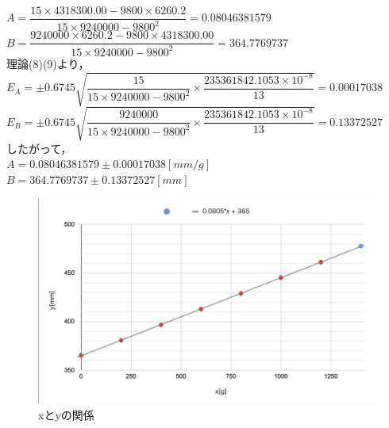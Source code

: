 \documentclass[a4paper,1pt]{jsarticle}
\begin{document}
$A=\dfrac{15\times4318300.00-9800\times6260.2}{15\times9240000-9800^2}=0.08046381579$\\

$B=\dfrac{9240000\times6260.2-9800\times4318300.00}{15\times9240000-9800^2}=364.7769737$\\

理論(8)(9)より，\\

$E_A=\pm0.6745\sqrt{\dfrac{15}{15\times9240000-9800^2}\times\dfrac{235361842.1053\times10^{-8}}{13}}=0.00017038$\\

$E_B=\pm0.6745\sqrt{\dfrac{9240000}{15\times9240000-9800^2}\times\dfrac{235361842.1053\times10^{-8}}{13}}=0.13372527$\\

したがって，\\

$A=0.08046381579\pm0.00017038[mm/g]$\\

$B=364.7769737\pm0.13372527[mm]$\\

\begin{figure}[h]
  \begin{center}
  \includegraphics[width=150mm]{actE.png}
  \caption{xとyの関係}
  \end{center}
\end{figure}


\clearpage
\end{document}
